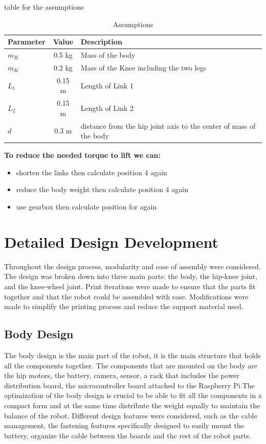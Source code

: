 table for the assumptions
\begin{table}[h]
	\centering
	\caption{Assumptions}
	\label{tab:assumptions}
	\begin{tabular}{lcl}
		\toprule
		Parameter & Value & Description 			  \\
		\midrule
		$m_B$         & 0.5 kg  & Mass of the body  \\
		$m_K$         & 0.2 kg  & Mass of the Knee including the two legs\\
		$L_1$         & 0.15 m   & Length of Link 1  \\
		$L_2$         & 0.15 m   & Length of Link 2   \\
		$d$ 	  	  & 0.3 m   & distance from the hip joint axis to the center of mass of the body   \\
		\bottomrule
	\end{tabular}
\end{table}

\begin{notebox}
	\textbf{To reduce the needed torque to lift we can:}
	\begin{itemize}
		\item shorten the links then calculate position 4 again
		\item reduce the body weight then calculate position 4 again
		\item use gearbox then calculate position for again
	\end{itemize}
\end{notebox}
\section{Detailed Design Development}
Throughout the design process, modularity and ease of assembly were considered.
The design was broken down into three main parts: the body, the hip-knee joint, and the knee-wheel joint.
Print iterations were made to ensure that the parts fit together and that the robot could be assembled with ease. Modifications were made to simplify the printing process and reduce the support material used.

\subsection{Body Design}

The body design is the main part of the robot, it is the main structure that holds all the components together.
The components that are mounted on the body are the hip motors, the battery, camera, sensor, a rack that includes the power distribution board, the microcontroller board attached to the Raspberry Pi.The optimization of the body design is crucial to be able to fit all the components in a compact form and at the same time distribute the weight equally to maintain the balance of the robot.
Different design features were considered, such as the cable management, the fastening features specifically designed to easily mount the battery, organize the cable between the boards and the rest of the robot parts.

